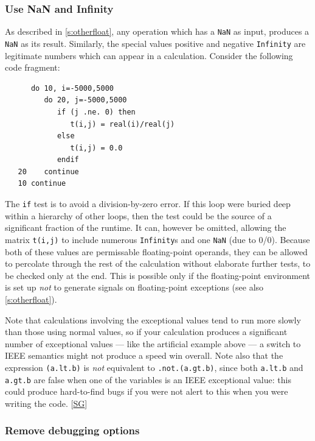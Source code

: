 \documentclass[11pt,oneside,chapters]{starlink}
\begin{document}
\subsubsection{Use NaN and Infinity}
\label{s:optimnan}


As described in \ref{s:otherfloat}, any operation
which has a \texttt{NaN} as input, produces a
\texttt{NaN} as its result.  Similarly, the special
values positive and negative \texttt{Infinity} are
legitimate numbers which can appear in a calculation.
Consider the following code fragment:

\begin{verbatim}
      do 10, i=-5000,5000
         do 20, j=-5000,5000
            if (j .ne. 0) then
               t(i,j) = real(i)/real(j)
            else
               t(i,j) = 0.0
            endif
   20    continue
   10 continue
\end{verbatim}

The \texttt{if} test is to avoid a division-by-zero
error.  If this loop were buried deep within a hierarchy
of other loops, then the test could be the source of a
significant fraction of the runtime.  It can, however be
omitted, allowing the matrix \texttt{t(i,j)} to
include numerous \texttt{Infinity}s and one
\texttt{NaN} (due to 0/0).  Because both of these
values are permissable floating-point operands, they can
be allowed to percolate through the rest of the
calculation without elaborate further tests, to be
checked only at the end.  This is possible only if the
floating-point environment is set up \emph{not} to
generate signals on floating-point exceptions (see also
\ref{s:otherfloat}).

Note that calculations involving the exceptional values
tend to run more slowly than those using normal values,
so if your calculation produces a significant number of
exceptional values --- like the artificial example above
--- a switch to IEEE semantics might not produce a speed
win overall.  Note also that the expression
\texttt{(a.lt.b)} is \emph{not} equivalent to
\texttt{.not.(a.gt.b)}, since both
\texttt{a.lt.b} and
\texttt{a.gt.b} are false
when one of the variables is an IEEE exceptional value:
this could produce hard-to-find bugs if you were not
alert to this when you were writing the code.
[\hyperlink{ta:sg}{SG}]


\subsubsection{Remove debugging options}
\end{document}
